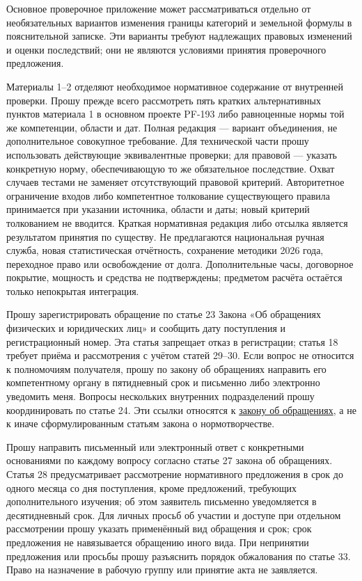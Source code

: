 \documentclass[14pt,a4paper]{extarticle}
\begin{document}
Основное проверочное приложение может рассматриваться отдельно от необязательных вариантов изменения границы категорий и земельной формулы в пояснительной записке. Эти варианты требуют надлежащих правовых изменений и оценки последствий; они не являются условиями принятия проверочного предложения.

Материалы 1–2 отделяют необходимое нормативное содержание от внутренней проверки. Прошу прежде всего рассмотреть пять кратких альтернативных пунктов материала 1 в основном проекте PF-193 либо равноценные нормы той же компетенции, области и дат. Полная редакция — вариант объединения, не дополнительное совокупное требование. Для технической части прошу использовать действующие эквивалентные проверки; для правовой — указать конкретную норму, обеспечивающую то же обязательное последствие. Охват случаев тестами не заменяет отсутствующий правовой критерий. Авторитетное ограничение входов либо компетентное толкование существующего правила принимается при указании источника, области и даты; новый критерий толкованием не вводится. Краткая нормативная редакция либо отсылка является результатом принятия по существу. Не предлагаются национальная ручная служба, новая статистическая отчётность, сохранение методики 2026 года, переходное право или освобождение от долга. Дополнительные часы, договорное покрытие, мощность и средства не подтверждены; предметом расчёта остаётся только непокрытая интеграция.

Прошу зарегистрировать обращение по статье 23 Закона «Об обращениях физических и юридических лиц» и сообщить дату поступления и регистрационный номер. Эта статья запрещает отказ в регистрации; статья 18 требует приёма и рассмотрения с учётом статей 29–30. Если вопрос не относится к полномочиям получателя, прошу по закону об обращениях направить его компетентному органу в пятидневный срок и письменно либо электронно уведомить меня. Вопросы нескольких внутренних подразделений прошу координировать по статье 24. Эти ссылки относятся к \href{https://lex.uz/docs/-3336169}{закону об обращениях}, а не к иначе сформулированным статьям закона о нормотворчестве.

Прошу направить письменный или электронный ответ с конкретными основаниями по каждому вопросу согласно статье 27 закона об обращениях. Статья 28 предусматривает рассмотрение нормативного предложения в срок до одного месяца со дня поступления, кроме предложений, требующих дополнительного изучения; об этом заявитель письменно уведомляется в десятидневный срок. Для личных просьб об участии и доступе при отдельном рассмотрении прошу указать применённый вид обращения и срок; срок предложения не навязывается обращению иного вида. При непринятии предложения или просьбы прошу разъяснить порядок обжалования по статье 33. Право на назначение в рабочую группу или принятие акта не заявляется.
\end{document}
